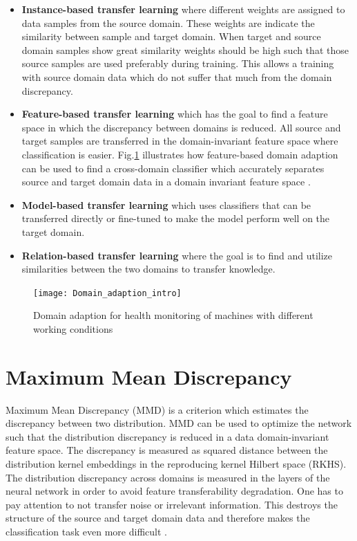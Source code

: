 \begin{itemize}
\item \textbf{Instance-based transfer learning} where different weights are assigned to data samples from the source domain. These weights are indicate the similarity between sample and target domain. When target and source domain samples show great similarity weights should be high such that those source samples are used preferably during training. This allows a training with source domain data which do not suffer that much from the domain discrepancy. 
\item \textbf{Feature-based transfer learning} which has the goal to find a feature space in which the discrepancy between domains is reduced. All source and target samples are transferred in the domain-invariant feature space where classification is easier. Fig.\ref{fig:Domain_adaption_intro} illustrates how feature-based domain adaption can be used to find a cross-domain classifier which accurately separates source and target domain data in a domain invariant feature space \cite{Pandhare2021}. 
\item \textbf{Model-based transfer learning} which uses classifiers that can be transferred directly or fine-tuned to make the model perform well on the target domain.
\item \textbf{Relation-based transfer learning} where the goal is to find and utilize similarities between the two domains to transfer knowledge. 
\end{itemize}


\begin{figure}[htpb]
  \centering
  \texttt{[image: Domain\_adaption\_intro]}
  \caption {Domain adaption for health monitoring of machines with different working conditions \cite{Pandhare2021}} \label{fig:Domain_adaption_intro}
\end{figure}
\FloatBarrier 



\section{Maximum Mean Discrepancy}
Maximum Mean Discrepancy (MMD) is a criterion which estimates the discrepancy between two distribution. MMD can be used to optimize the network such that the distribution discrepancy is reduced in a data domain-invariant feature space. The discrepancy is measured as squared distance between the distribution kernel embeddings in the reproducing kernel Hilbert space (RKHS). The distribution discrepancy across domains is measured in the layers of the neural network in order to avoid feature transferability degradation. One has to pay attention to not transfer noise or irrelevant information. This destroys the structure of the source and target domain data and therefore makes the classification task even more difficult \cite{li2020}. 

